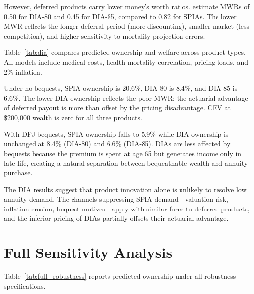 \documentclass[12pt]{article}
\begin{document}
However, deferred products carry lower money's worth ratios. \citet{wettstein2021} estimate MWRs of 0.50 for DIA-80 and 0.45 for DIA-85, compared to 0.82 for SPIAs. The lower MWR reflects the longer deferral period (more discounting), smaller market (less competition), and higher sensitivity to mortality projection errors.



Table~\ref{tab:dia} compares predicted ownership and welfare across product types. All models include medical costs, health-mortality correlation, pricing loads, and 2\% inflation.

Under no bequests, SPIA ownership is 20.6\%, DIA-80 is 8.4\%, and DIA-85 is 6.6\%. The lower DIA ownership reflects the poor MWR: the actuarial advantage of deferred payout is more than offset by the pricing disadvantage. CEV at \$200,000 wealth is zero for all three products.

With DFJ bequests, SPIA ownership falls to 5.9\% while DIA ownership is unchanged at 8.4\% (DIA-80) and 6.6\% (DIA-85). DIAs are less affected by bequests because the premium is spent at age 65 but generates income only in late life, creating a natural separation between bequeathable wealth and annuity purchase.

The DIA results suggest that product innovation alone is unlikely to resolve low annuity demand. The channels suppressing SPIA demand---valuation risk, inflation erosion, bequest motives---apply with similar force to deferred products, and the inferior pricing of DIAs partially offsets their actuarial advantage.


\section{Full Sensitivity Analysis}
\label{app:robustness}

Table~\ref{tab:full_robustness} reports predicted ownership under all robustness specifications.
\end{document}

